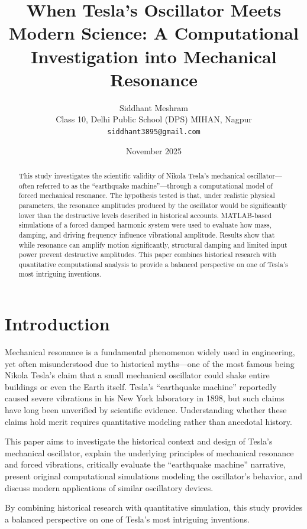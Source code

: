 \documentclass[12pt,a4paper]{article}
\title{When Tesla's Oscillator Meets Modern Science: A Computational Investigation into Mechanical Resonance}
\author{
  Siddhant Meshram\\
  Class 10, Delhi Public School (DPS) MIHAN, Nagpur\\
  \texttt{siddhant3895@gmail.com}
}
\date{November 2025}
\begin{document}
\maketitle

\begin{abstract}
This study investigates the scientific validity of Nikola Tesla's mechanical oscillator---often referred to as the ``earthquake machine''---through a computational model of forced mechanical resonance. The hypothesis tested is that, under realistic physical parameters, the resonance amplitudes produced by the oscillator would be significantly lower than the destructive levels described in historical accounts. MATLAB-based simulations of a forced damped harmonic system were used to evaluate how mass, damping, and driving frequency influence vibrational amplitude. Results show that while resonance can amplify motion significantly, structural damping and limited input power prevent destructive amplitudes. This paper combines historical research with quantitative computational analysis to provide a balanced perspective on one of Tesla's most intriguing inventions.
\end{abstract}

\section*{Introduction}
Mechanical resonance is a fundamental phenomenon widely used in engineering, yet often misunderstood due to historical myths---one of the most famous being Nikola Tesla's claim that a small mechanical oscillator could shake entire buildings or even the Earth itself. Tesla's ``earthquake machine'' reportedly caused severe vibrations in his New York laboratory in 1898, but such claims have long been unverified by scientific evidence. Understanding whether these claims hold merit requires quantitative modeling rather than anecdotal history.

This paper aims to investigate the historical context and design of Tesla's mechanical oscillator, explain the underlying principles of mechanical resonance and forced vibrations, critically evaluate the ``earthquake machine'' narrative, present original computational simulations modeling the oscillator's behavior, and discuss modern applications of similar oscillatory devices.

By combining historical research with quantitative simulation, this study provides a balanced perspective on one of Tesla's most intriguing inventions.
\end{document}
